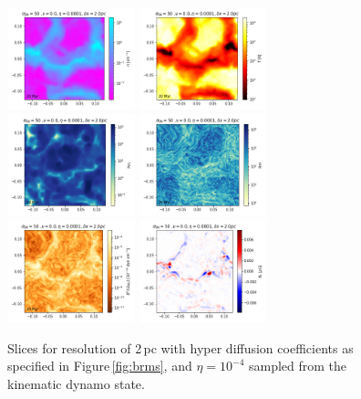 \documentclass[iop,apj,numberedappendix,twocolappendix]{emulateapj}
\begin{document}
\begin{figure}
\centering
\includegraphics[trim=0.0cm 0.00cm 0.0cm 0.0cm,clip=true,width=0.33\textwidth]{csc_figs/rho2pcPm0e-4_00.png}
\includegraphics[trim=0.0cm 0.00cm 0.0cm 0.0cm,clip=true,width=0.33\textwidth]{csc_figs/tt2pcPm0e-4_00.png}
\includegraphics[trim=0.0cm 0.00cm 0.0cm 0.0cm,clip=true,width=0.33\textwidth]{csc_figs/Pm2pcPm0e-4_00.png}
\includegraphics[trim=0.0cm 0.00cm 0.0cm 0.0cm,clip=true,width=0.33\textwidth]{csc_figs/Rm2pcPm0e-4_00.png}
\includegraphics[trim=0.0cm 0.00cm 0.0cm 0.0cm,clip=true,width=0.33\textwidth]{csc_figs/pb2pcPm0e-4_00.png}
\includegraphics[trim=0.0cm 0.00cm 0.0cm 0.0cm,clip=true,width=0.33\textwidth]{csc_figs/bb12pcPm0e-4_00.png}
\caption{
Slices for resolution of 2\,pc with hyper diffusion coefficients as 
specified in Figure\,\ref{fig:brms}, and $\eta=10^{-4}$ sampled from the 
kinematic dynamo state.
\label{fig:2pcUB}
}
\end{figure}
\end{document}
